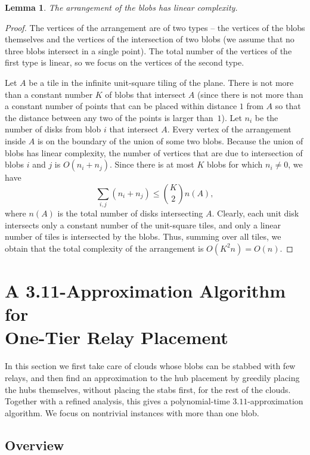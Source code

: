 \documentclass[11pt,a4paper]{article}
\newtheorem{lemma}{Lemma}
\theoremstyle{definition}
\theoremstyle{remark}
\newcommand{\mytitlebreak}{\texorpdfstring{\\}{ }}
\begin{document}
\begin{lemma}\label{lem:arr}
The arrangement of the blobs has linear complexity.
\end{lemma}
\begin{proof}
The vertices of the arrangement are of two types -- the vertices of the blobs themselves and the vertices of the intersection of two blobs (we assume that no three blobs intersect in a single point). The total number of the vertices of the first type is linear, so we focus on the vertices of the second type.

Let $A$ be a tile in the infinite unit-square tiling of the plane. There is not more than a constant number $K$ of blobs that intersect $A$ (since there is not more than a constant number of points that can be placed within distance $1$ from $A$ so that the distance between any two of the points is larger than~$1$). Let $n_i$ be the number of disks from blob $i$ that intersect $A$. Every vertex of the arrangement inside $A$ is on the boundary of the union of some two blobs. Because the union of blobs has linear complexity, the number of vertices that are due to intersection of blobs $i$ and $j$ is $O(n_i +n_j)$. Since there is at most $K$ blobs for which $n_i \ne 0$, we have
\[
    \sum_{i,j} (n_i+n_j) \le \binom{K}2 n(A),
\]
where $n(A)$ is the total number of disks intersecting $A$. Clearly, each unit disk intersects only a constant number of the unit-square tiles, and only a linear number of tiles is intersected by the blobs. Thus, summing over all tiles, we obtain that the total complexity of the arrangement is $O(K^2 n)=O(n)$.
\end{proof}




\section{A 3.11-Approximation Algorithm for\mytitlebreak One-Tier Relay Placement}\label{sec_apx1tierim}

In this section we first take care of clouds whose blobs can be stabbed with few relays, and then find an approximation to the hub placement by greedily placing the hubs themselves, without placing the stabs first, for the rest of the clouds. Together with a refined analysis, this gives a polynomial-time $3.11$-approximation algorithm.  We focus on nontrivial instances with more than one blob.

\subsection{Overview}
\end{document}
